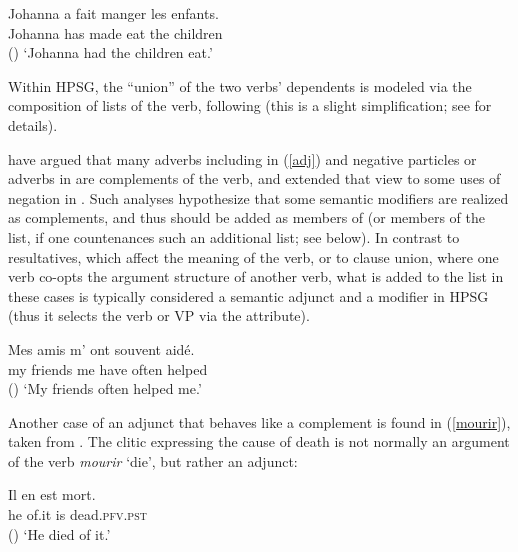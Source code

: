 \documentclass[output=paper
 	        ,biblatex
                ,babelshorthands
                ,newtxmath
                ,draftmode
                ,colorlinks, citecolor=brown
]{langscibook}
\begin{document}
\begin{exe}
\ex \label{faire}
\gll Johanna a fait manger les enfants. \\
     Johanna has made eat the children \\\hfill()
\glt `Johanna had the children eat.'
\end{exe}

\noindent
Within HPSG, the ``union'' of the two verbs' dependents is modeled via the composition of \argst lists of the  verb, following \citet{HinrichsandNakazawa1994} (this is a slight simplification; see   for details). 

\citet{AbeilleandGodard1997} have argued that many adverbs including  in (\ref{adj}) and negative particles or adverbs in  are complements of the verb, and \citet{KimandSag2002} extended that view to some uses of negation in . Such analyses hypothesize that some semantic modifiers are realized as complements, and thus should be added as members of \argst (or members of the \deps list, if one countenances such an additional list; see below). In contrast to resultatives, which affect the meaning of the verb, or to clause union, where one verb co-opts the argument structure of another verb, what is added to the \argst list in these cases is typically considered a semantic adjunct and a modifier in HPSG (thus it selects the verb or VP via the  attribute). 

\begin{exe}
\ex\label{adj}
 \gll
	Mes amis m’ ont souvent aidé. \\
	my friends me have often helped \\\hfill()
	\glt `My friends often helped me.'
\end{exe}


Another case of an adjunct that behaves like a complement is found in (\ref{mourir}), taken from \citep[81]{KoenigandDavis2006}.  The clitic  expressing the cause of death   is not normally an argument of the verb \textit{mourir} `die', but rather an adjunct: %

\ea
\label{mourir}
\gll Il en est mort. \\
     he of.it is dead.\textsc{pfv.pst} \\\hfill()
\glt `He died of it.'
\z
\end{document}

